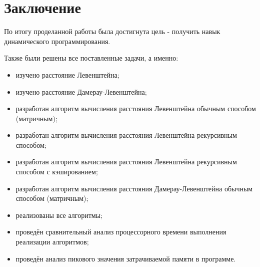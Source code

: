 \chapter*{Заключение}
По итогу проделанной работы была достигнута цель - получить навык динамического программирования.

Также были решены все поставленные задачи, а именно:

\begin{itemize}
	\item изучено расстояние Левенштейна;
	\item изучено расстояние Дамерау-Левенштейна;
	\item разработан алгоритм вычисления расстояния Левенштейна обычным способом (матричным);
	\item разработан алгоритм вычисления расстояния Левенштейна рекурсивным способом;
	\item разработан алгоритм вычисления расстояния Левенштейна рекурсивным способом с кэшированием;
	\item разработан алгоритм вычисления расстояния Дамерау-Левенштейна обычным способом (матричным);
	\item реализованы все алгоритмы;
	\item проведён сравнительный анализ процессорного времени выполнения реализации алгоритмов;
	\item проведён анализ пикового значения затрачиваемой памяти в программе.
\end{itemize}